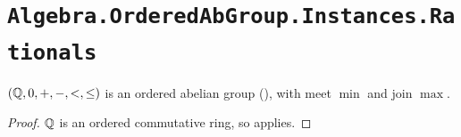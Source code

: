 \section{\texttt{Algebra.OrderedAbGroup.Instances.Rationals}}

\begin{theorem}
  \label{QOrderedAbGroup}
  $(\mathbb{Q}, 0, +, -, <, \le)$ is an ordered abelian group (), with meet $\min$ and join $\max$.
\end{theorem}
\begin{proof}
  $\mathbb{Q}$ is an ordered commutative ring, so  applies.
\end{proof}
